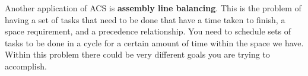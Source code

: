 \documentclass[12pt]{article}
\begin{document}
Another application of ACS is \textbf{assembly line balancing}. This is the problem of having a set of tasks that need to be done that have a time taken to finish, a space requirement, and a precedence relationship. You need to schedule sets of tasks to be done in a cycle for a certain amount of time within the space we have. Within this problem there could be very different goals you are trying to accomplish.




\end{document}
